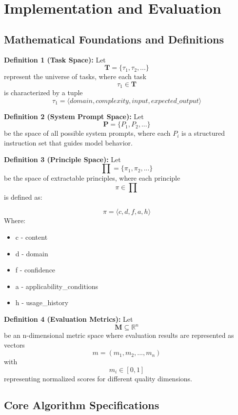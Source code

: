 \documentclass[10pt,a4paper,twocolumn]{article}
\begin{document}
\section{{Implementation and Evaluation} }



\subsection{Mathematical Foundations and Definitions}

\textbf{Definition 1 (Task Space):} 
Let \[\textbf{T} = \{\tau_1, \tau_2, ...\}\] represent the universe of tasks, where each task \[\tau_1 \in \textbf{T}\] is characterized by a tuple \[\tau_1 = ⟨domain, complexity, input, expected\_output⟩\]


\textbf{Definition 2 (System Prompt Space):} 
Let \[\textbf{P} = \{P_1, P_2, ...\}\] be the space of all possible system prompts, where each $P_i$  is a structured instruction set that guides model behavior.


\textbf{Definition 3 (Principle Space):} 
Let \[\prod = \{\pi_1, \pi_2, ... \} \] be the space of extractable principles, where each principle \[\pi \in \prod\] is defined as:

\[\pi = ⟨c, d, f, a, h⟩ \]
Where:

\begin{itemize}
    \item c - content
    \item d - domain
    \item f - confidence
    \item a - applicability\_conditions
    \item h - usage\_history
\end{itemize}


\textbf{Definition 4 (Evaluation Metrics):} Let 
\[\textbf{M} \subseteq \mathbb{R}^n\] be an n-dimensional metric space where evaluation results are represented as vectors \[m = (m_1, m_2, ..., m_n)\] with \[m_i \in [0,1]\] representing normalized scores for different quality dimensions.

\subsection{Core Algorithm Specifications}
\end{document}
